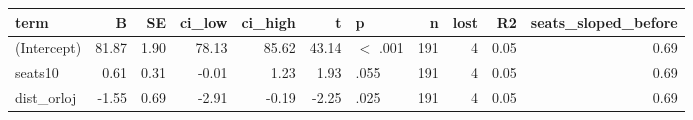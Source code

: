 \begin{tabular}{lrrrrrlrrrr}
  \toprule
term & B & SE & ci\_low & ci\_high & t & p & n & lost & R2 & seats\_sloped\_before \\ 
  \midrule
(Intercept) & 81.87 & 1.90 & 78.13 & 85.62 & 43.14 & $<$ .001 & 191 &   4 & 0.05 & 0.69 \\ 
  seats10 & 0.61 & 0.31 & -0.01 & 1.23 & 1.93 & .055 & 191 &   4 & 0.05 & 0.69 \\ 
  dist\_orloj & -1.55 & 0.69 & -2.91 & -0.19 & -2.25 & .025 & 191 &   4 & 0.05 & 0.69 \\ 
   \bottomrule
\end{tabular}
